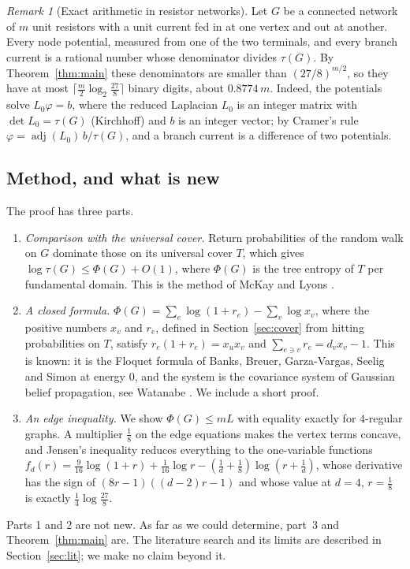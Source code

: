 \documentclass[11pt]{amsart}
\theoremstyle{plain}
\theoremstyle{remark}
\newtheorem{remark}[theorem]{Remark}
\begin{document}
\begin{remark}[Exact arithmetic in resistor networks]\label{rem:bits}
Let $G$ be a connected network of $m$ unit resistors with a unit current fed in at one vertex and out at another.
Every node potential, measured from one of the two terminals, and every branch current is a rational number whose
denominator divides $\tau(G)$. By Theorem~\ref{thm:main} these denominators are smaller than $(27/8)^{m/2}$, so
they have at most $\lceil \tfrac m2\log_2\tfrac{27}{8}\rceil$ binary digits, about $0.8774\,m$. Indeed, the
potentials solve $L_0\varphi=b$, where the reduced Laplacian $L_0$ is an integer matrix with $\det L_0=\tau(G)$
(Kirchhoff) and $b$ is an integer vector; by Cramer's rule $\varphi=\operatorname{adj}(L_0)\,b/\tau(G)$, and a
branch current is a difference of two potentials.
\end{remark}

\subsection*{Method, and what is new}
The proof has three parts.
\begin{enumerate}
\item \emph{Comparison with the universal cover.} Return probabilities of the random walk on $G$ dominate those on
  its universal cover $T$, which gives $\log\tau(G)\le\Phi(G)+O(1)$, where $\Phi(G)$ is the tree entropy of $T$ per
  fundamental domain. This is the method of McKay \cite{McKay} and Lyons \cite{Lyons}.
\item \emph{A closed formula.} $\Phi(G)=\sum_e\log(1+r_e)-\sum_v\log x_v$, where the positive numbers $x_v$ and
  $r_e$, defined in Section~\ref{sec:cover} from hitting probabilities on $T$, satisfy $r_e(1+r_e)=x_ux_v$ and
  $\sum_{e\ni v}r_e=d_vx_v-1$. This is known: it is the Floquet formula of
  Banks, Breuer, Garza-Vargas, Seelig and Simon \cite{BBGSS} at energy $0$, and the system is the covariance system
  of Gaussian belief propagation, see Watanabe \cite{Watanabe}. We include a short proof.
\item \emph{An edge inequality.} We show $\Phi(G)\le mL$ with equality exactly for $4$-regular graphs. A
  multiplier $\tfrac18$ on the edge equations makes the vertex terms concave, and Jensen's inequality reduces
  everything to the one-variable functions
  $f_d(r)=\tfrac9{16}\log(1+r)+\tfrac1{16}\log r-(\tfrac1d+\tfrac18)\log(r+\tfrac1d)$, whose derivative has the sign
  of $(8r-1)((d-2)r-1)$ and whose value at $d=4$, $r=\tfrac18$ is exactly $\tfrac14\log\tfrac{27}{8}$.
\end{enumerate}
Parts 1 and 2 are not new. As far as we could determine, part~3 and Theorem~\ref{thm:main} are. The literature
search and its limits are described in Section~\ref{sec:lit}; we make no claim beyond it.
\end{document}
